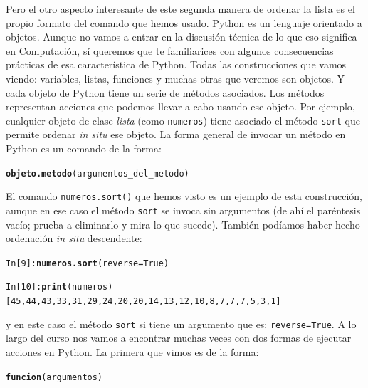 \documentclass[10pt,a4paper]{article}\usepackage[]{graphicx}\usepackage[]{color}
\makeatletter
\newcommand{\hlstd}[1]{\textcolor[rgb]{0.345,0.345,0.345}{#1}}%
\newcommand{\hlkwd}[1]{\textcolor[rgb]{0.737,0.353,0.396}{\textbf{#1}}}%
\newenvironment{kframe}{%
 \def\at@end@of@kframe{}%
 \ifinner\ifhmode%
  \def\at@end@of@kframe{\end{minipage}}%
  \begin{minipage}{\columnwidth}%
 \fi\fi%
 \def\FrameCommand##1{\hskip\@totalleftmargin \hskip-\fboxsep
 \colorbox{shadecolor}{##1}\hskip-\fboxsep
     \hskip-\linewidth \hskip-\@totalleftmargin \hskip\columnwidth}%
 \MakeFramed {\advance\hsize-\width
   \@totalleftmargin\z@ \linewidth\hsize
   \@setminipage}}%
 {\par\unskip\endMakeFramed%
 \at@end@of@kframe}
\newenvironment{knitrout}{}{} %
\newcounter {cont01}
\makeatother
\begin{document}
Pero el otro aspecto interesante de este segunda manera de ordenar la lista  es el propio formato del comando que hemos usado. Python es un lenguaje {\sf orientado a objetos}. Aunque no vamos a entrar en la discusión técnica de lo que eso significa en Computación, sí queremos que te familiarices con algunos consecuencias prácticas de esa característica de Python. Todas las construcciones que vamos viendo: variables, listas, funciones y muchas otras que veremos son {\sf objetos}. Y cada objeto de Python tiene un serie de {\sf métodos} asociados. Los métodos representan acciones que podemos llevar a cabo usando ese objeto. Por ejemplo, cualquier objeto de clase {\em lista} (como  {\tt numeros}) tiene asociado el método {\tt sort} que permite ordenar {\em in situ} ese objeto. La forma general de invocar un método en Python es un comando de la forma:
\begin{knitrout}
\color{fgcolor}\begin{kframe}
\begin{alltt}
\hlkwd{objeto.metodo}\hlstd{(argumentos_del_metodo)}
\end{alltt}
\end{kframe}
\end{knitrout}
El comando {\tt numeros.sort()} que hemos visto es un ejemplo de esta construcción, aunque en ese caso el método {\tt sort} se invoca sin argumentos (de ahí el paréntesis vacío; prueba a eliminarlo y mira lo que sucede). También podíamos haber hecho ordenación {\em in situ} descendente:
\begin{knitrout}
\color{fgcolor}\begin{kframe}
\begin{alltt}
In [9]: \hlkwd{numeros.sort}(reverse=True)

In [10]: \hlkwd{print}(numeros)
[45, 44, 43, 33, 31, 29, 24, 20, 20, 14, 13, 12, 10, 8, 7, 7, 7, 5, 3, 1]
\end{alltt}
\end{kframe}
\end{knitrout}
y en este caso el método {\tt sort} si tiene un argumento que es: {\tt reverse=True}. A lo largo del curso nos vamos a encontrar muchas veces con dos formas de ejecutar acciones en Python. La primera que vimos es de la forma:
\begin{knitrout}
\color{fgcolor}\begin{kframe}
\begin{alltt}
\hlkwd{funcion}\hlstd{(argumentos)}
\end{alltt}
\end{kframe}
\end{knitrout}
\end{document}
